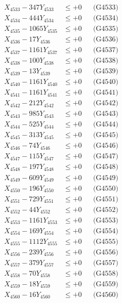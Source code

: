 \documentclass[a4paper,10pt]{article}
\begin{document}
{\begin{align}
X_{4533} - 347Y_{4533} &\leq +0 && \text{(G4533)} \\
X_{4534} - 444Y_{4534} &\leq +0 && \text{(G4534)} \\
X_{4535} - 1065Y_{4535} &\leq +0 && \text{(G4535)} \\
X_{4536} - 17Y_{4536} &\leq +0 && \text{(G4536)} \\
X_{4537} - 1161Y_{4537} &\leq +0 && \text{(G4537)} \\
X_{4538} - 100Y_{4538} &\leq +0 && \text{(G4538)} \\
X_{4539} - 13Y_{4539} &\leq +0 && \text{(G4539)} \\
X_{4540} - 1161Y_{4540} &\leq +0 && \text{(G4540)} \\
\allowbreak
X_{4541} - 1161Y_{4541} &\leq +0 && \text{(G4541)} \\
X_{4542} - 212Y_{4542} &\leq +0 && \text{(G4542)} \\
X_{4543} - 985Y_{4543} &\leq +0 && \text{(G4543)} \\
X_{4544} - 525Y_{4544} &\leq +0 && \text{(G4544)} \\
X_{4545} - 313Y_{4545} &\leq +0 && \text{(G4545)} \\
X_{4546} - 74Y_{4546} &\leq +0 && \text{(G4546)} \\
X_{4547} - 115Y_{4547} &\leq +0 && \text{(G4547)} \\
X_{4548} - 197Y_{4548} &\leq +0 && \text{(G4548)} \\
X_{4549} - 609Y_{4549} &\leq +0 && \text{(G4549)} \\
X_{4550} - 196Y_{4550} &\leq +0 && \text{(G4550)} \\
\allowbreak
X_{4551} - 729Y_{4551} &\leq +0 && \text{(G4551)} \\
X_{4552} - 44Y_{4552} &\leq +0 && \text{(G4552)} \\
X_{4553} - 1161Y_{4553} &\leq +0 && \text{(G4553)} \\
X_{4554} - 169Y_{4554} &\leq +0 && \text{(G4554)} \\
X_{4555} - 1112Y_{4555} &\leq +0 && \text{(G4555)} \\
X_{4556} - 239Y_{4556} &\leq +0 && \text{(G4556)} \\
X_{4557} - 379Y_{4557} &\leq +0 && \text{(G4557)} \\
X_{4558} - 70Y_{4558} &\leq +0 && \text{(G4558)} \\
X_{4559} - 18Y_{4559} &\leq +0 && \text{(G4559)} \\
X_{4560} - 16Y_{4560} &\leq +0 && \text{(G4560)} \\

\end{align}}
\end{document}
